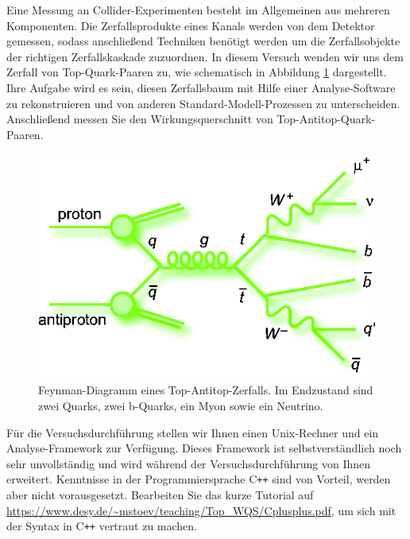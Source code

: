 	Eine Messung an Collider-Experimenten besteht im Allgemeinen aus mehreren Komponenten. Die Zerfallsprodukte eines Kanals werden von dem Detektor gemessen, sodass anschlie\ss{}end Techniken ben\"otigt werden um die Zerfallsobjekte der richtigen Zerfallskaskade zuzuordnen. In diesem Versuch wenden wir uns dem Zerfall von Top-Quark-Paaren zu, wie schematisch in Abbildung \ref{ttbarsemilep} dargestellt. Ihre Aufgabe wird es sein, diesen Zerfallsbaum mit Hilfe einer Analyse-Software zu rekonstruieren und von anderen Standard-Modell-Prozessen zu unterscheiden. Anschlie\ss{}end messen Sie den Wirkungsquerschnitt von Top-Antitop-Quark-Paaren.
\begin{figure}[h]
\centerline{\includegraphics[scale=0.5]{pics_feynman_ttbar_mujets}}
\caption{Feynman-Diagramm eines Top-Antitop-Zerfalls. Im Endzustand sind zwei Quarks, zwei b-Quarks, ein Myon sowie ein Neutrino.}
\label{ttbarsemilep}
\end{figure}

F\"ur die Versuchsdurchf\"uhrung stellen wir Ihnen einen Unix-Rechner und ein Analyse-Framework zur Verf\"ugung. Dieses Framework ist selbstverst\"andlich noch sehr unvollst\"andig und wird w\"ahrend der Versuchsdurchf\"uhrung von Ihnen erweitert. Kenntnisse in der Programmiersprache C\texttt{++} sind von Vorteil, werden aber nicht vorausgesetzt. Bearbeiten Sie das kurze Tutorial auf
\url{https://www.desy.de/~mstoev/teaching/Top_WQS/Cplusplus.pdf}, um sich mit der Syntax in C\texttt{++} vertraut zu machen.\\

